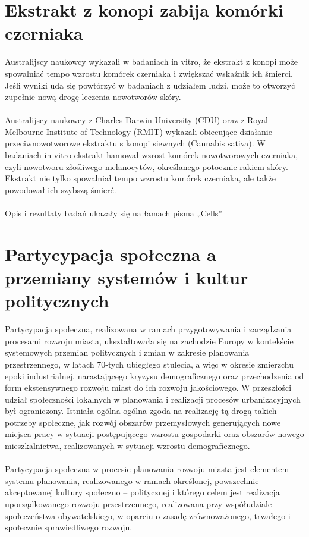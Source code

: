 \documentclass{article}
\begin{document}
\section{Ekstrakt z konopi zabija komórki czerniaka}
Australijscy naukowcy wykazali w badaniach in vitro, że ekstrakt z konopi może spowalniać tempo wzrostu komórek czerniaka i zwiększać wskaźnik ich śmierci. Jeśli wyniki uda się powtórzyć w badaniach z udziałem ludzi, może to otworzyć zupełnie nową drogę leczenia nowotworów skóry.
\paragraph{}
Australijscy naukowcy z Charles Darwin University (CDU) oraz z Royal Melbourne Institute of Technology (RMIT) wykazali obiecujące działanie przeciwnowotworowe ekstraktu s konopi siewnych (Cannabis sativa). W badaniach in vitro ekstrakt hamował wzrost komórek nowotworowych czerniaka, czyli nowotworu złośliwego melanocytów, określanego potocznie rakiem skóry. Ekstrakt nie tylko spowalniał tempo wzrostu komórek czerniaka, ale także powodował ich szybszą śmierć.
\paragraph{}
Opis i rezultaty badań ukazały się na łamach pisma „Cells” \cite{Konopie}
\section{Partycypacja społeczna a przemiany systemów i kultur politycznych}
Partycypacja społeczna, realizowana w ramach przygotowywania i zarządzania procesami rozwoju miasta, ukształtowała się na zachodzie Europy w kontekście systemowych przemian politycznych i zmian w zakresie planowania przestrzennego, w latach 70-tych ubiegłego stulecia, a więc w okresie zmierzchu epoki industrialnej, narastającego kryzysu demograficznego oraz przechodzenia od form ekstensywnego rozwoju miast do ich rozwoju jakościowego. W przeszłości udział społeczności lokalnych w planowania i realizacji procesów urbanizacyjnych był ograniczony. Istniała ogólna ogólna zgoda na realizację tą drogą takich potrzeby społeczne, jak
rozwój obszarów przemysłowych generujących nowe miejsca pracy w sytuacji postępującego wzrostu gospodarki oraz obszarów nowego mieszkalnictwa, realizowanych w sytuacji wzrostu demograficznego.
\paragraph{}
Partycypacja społeczna w procesie planowania rozwoju miasta jest elementem systemu planowania, realizowanego w ramach określonej, powszechnie akceptowanej kultury społeczno – politycznej i którego celem jest realizacja uporządkowanego rozwoju przestrzennego, realizowana przy współudziale społeczeństwa obywatelskiego, w oparciu o zasadę zrównoważonego, trwałego i społecznie sprawiedliwego rozwoju.
\end{document}
